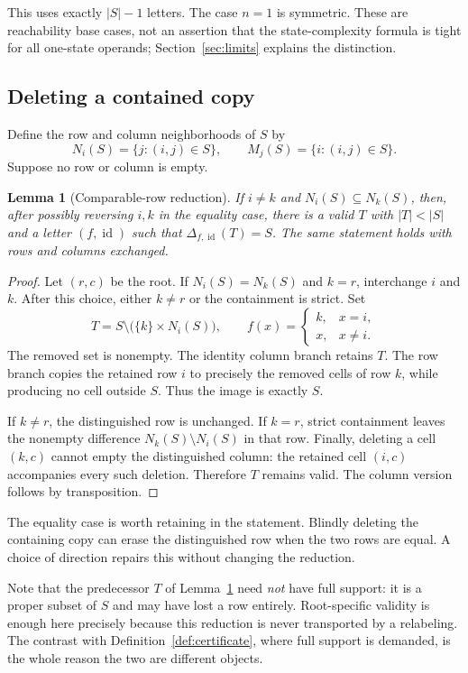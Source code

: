 \documentclass[11pt,letterpaper]{article}
\numberwithin{equation}{section}
\newtheorem{lemma}[theorem]{Lemma}
\theoremstyle{definition}
\theoremstyle{remark}
\newcommand{\id}{\operatorname{id}}
\begin{document}
This uses exactly $|S|-1$ letters. The case $n=1$ is symmetric. These are
reachability base cases, not an assertion that the state-complexity formula
is tight for all one-state operands; Section~\ref{sec:limits} explains the
distinction.

\subsection{Deleting a contained copy}
Define the row and column neighborhoods of $S$ by
\[
 N_i(S)=\{j:(i,j)\in S\},\qquad
 M_j(S)=\{i:(i,j)\in S\}.
\]
Suppose no row or column is empty.

\begin{lemma}[Comparable-row reduction]\label{lem:containment}
If $i\ne k$ and $N_i(S)\subseteq N_k(S)$, then, after possibly reversing
$i,k$ in the equality case, there is a valid $T$ with $|T|<|S|$ and a letter
$(f,\id)$ such that $\Delta_{f,\id}(T)=S$. The same statement holds with
rows and columns exchanged.
\end{lemma}
\begin{proof}
Let $(r,c)$ be the root. If $N_i(S)=N_k(S)$ and $k=r$, interchange $i$ and
$k$. After this choice, either $k\ne r$ or the containment is strict. Set
\[
 T=S\setminus\bigl(\{k\}\times N_i(S)\bigr),
 \qquad
 f(x)=\begin{cases}k,&x=i,\\ x,&x\ne i.\end{cases}
\]
The removed set is nonempty. The identity column branch retains $T$.
The row branch copies the retained row $i$ to precisely the removed cells
of row $k$, while producing no cell outside $S$. Thus the image is exactly
$S$.

If $k\ne r$, the distinguished row is unchanged. If $k=r$, strict
containment leaves the nonempty difference $N_k(S)\setminus N_i(S)$ in
that row. Finally, deleting a cell $(k,c)$ cannot empty the distinguished
column: the retained cell $(i,c)$ accompanies every such deletion.
Therefore $T$ remains valid. The column version follows by transposition.
\end{proof}

The equality case is worth retaining in the statement. Blindly deleting
the containing copy can erase the distinguished row when the two rows
are equal. A choice of direction repairs this without changing the
reduction.

Note that the predecessor $T$ of Lemma~\ref{lem:containment} need \emph{not}
have full support: it is a proper subset of $S$ and may have lost a row
entirely. Root-specific validity is enough here precisely because this
reduction is never transported by a relabeling. The contrast with
Definition~\ref{def:certificate}, where full support is demanded, is the
whole reason the two are different objects.
\end{document}

